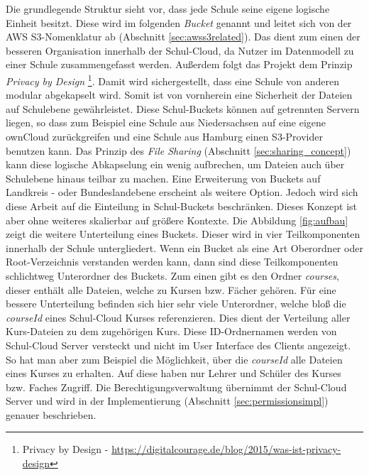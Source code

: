 Die grundlegende Struktur sieht vor, dass jede Schule seine eigene logische Einheit besitzt. Diese wird im folgenden \textit{Bucket} genannt und leitet sich von der AWS S3-Nomenklatur ab (Abschnitt \ref{sec:awss3related}). Das dient zum einen der besseren Organisation innerhalb der Schul-Cloud, da Nutzer im Datenmodell zu einer Schule zusammengefasst werden. Außerdem folgt das Projekt dem Prinzip \textit{Privacy by Design} \footnote{Privacy by Design - \url{https://digitalcourage.de/blog/2015/was-ist-privacy-design} }. Damit wird sichergestellt, dass eine Schule von anderen modular abgekapselt wird. Somit ist von vornherein  eine Sicherheit der Dateien auf Schulebene gewährleistet. Diese Schul-Buckets können auf getrennten Servern liegen, so dass zum Beispiel eine Schule aus Niedersachsen auf eine eigene ownCloud zurückgreifen und eine Schule aus Hamburg einen S3-Provider benutzen kann. Das Prinzip des \textit{File Sharing} (Abschnitt \ref{sec:sharing_concept}) kann diese logische Abkapselung ein wenig aufbrechen, um Dateien auch über Schulebene hinaus teilbar zu machen. Eine Erweiterung von Buckets auf Landkreis - oder Bundeslandebene erscheint als weitere Option. Jedoch wird sich diese Arbeit auf die Einteilung in Schul-Buckets beschränken. Dieses Konzept ist aber ohne weiteres skalierbar auf größere Kontexte.  Die Abbildung \ref{fig:aufbau} zeigt die weitere Unterteilung eines Buckets. Dieser wird in vier Teilkomponenten innerhalb der Schule  untergliedert. Wenn ein Bucket als eine Art Oberordner oder Root-Verzeichnis verstanden werden kann, dann sind diese Teilkomponenten schlichtweg Unterordner des Buckets. Zum einen gibt es den Ordner \textit{courses}, dieser enthält alle Dateien, welche zu Kursen bzw. Fächer gehören. Für eine bessere Unterteilung befinden sich hier sehr viele Unterordner, welche bloß die \textit{courseId} eines Schul-Cloud Kurses referenzieren. Dies dient der Verteilung aller Kurs-Dateien zu dem zugehörigen Kurs. Diese ID-Ordnernamen werden von Schul-Cloud Server versteckt und nicht im User Interface des  Clients angezeigt. So hat man aber zum Beispiel die Möglichkeit, über die \textit{courseId} alle Dateien eines Kurses zu erhalten. Auf diese haben nur Lehrer und Schüler des Kurses bzw. Faches Zugriff. Die Berechtigungsverwaltung übernimmt der Schul-Cloud Server und wird in der Implementierung (Abschnitt \ref{sec:permissionsimpl}) genauer beschrieben. \\

